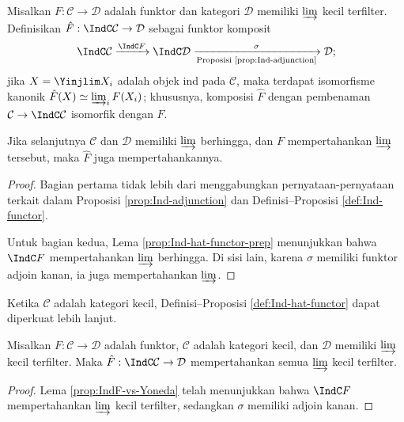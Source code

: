 \begin{definition-proposition}\label{def:Ind-hat-functor}
	Misalkan $F: \mathcal{C} \to \mathcal{D}$ adalah funktor dan kategori $\mathcal{D}$ memiliki $\varinjlim$ kecil terfilter. Definisikan $\hat{F}: \IndC\mathcal{C} \to \mathcal{D}$ sebagai funktor komposit
	\[ \IndC\mathcal{C} \xrightarrow{\IndC F} \IndC\mathcal{D} \xrightarrow[\text{Proposisi \ref{prop:Ind-adjunction}}]{\sigma} \mathcal{D}; \]
	jika $X = \Yinjlim X_i$ adalah objek ind pada $\mathcal{C}$, maka terdapat isomorfisme kanonik $\hat{F}(X) \simeq \varinjlim_i F(X_i)$; khususnya, komposisi $\hat{F}$ dengan pembenaman $\mathcal{C} \to \IndC\mathcal{C}$ isomorfik dengan $F$.
	
	Jika selanjutnya $\mathcal{C}$ dan $\mathcal{D}$ memiliki $\varinjlim$ berhingga, dan $F$ mempertahankan $\varinjlim$ tersebut, maka $\hat{F}$ juga mempertahankannya.
\end{definition-proposition}
\begin{proof}
	Bagian pertama tidak lebih dari menggabungkan pernyataan-pernyataan terkait dalam Proposisi \ref{prop:Ind-adjunction} dan Definisi--Proposisi \ref{def:Ind-functor}.
	
	Untuk bagian kedua, Lema \ref{prop:Ind-hat-functor-prep} menunjukkan bahwa $\IndC F$ mempertahankan $\varinjlim$ berhingga. Di sisi lain, karena $\sigma$ memiliki funktor adjoin kanan, ia juga mempertahankan $\varinjlim$.
\end{proof}

Ketika $\mathcal{C}$ adalah kategori kecil, Definisi--Proposisi \ref{def:Ind-hat-functor} dapat diperkuat lebih lanjut.

\begin{proposition}\label{prop:Ind-hat-small}
	Misalkan $F: \mathcal{C} \to \mathcal{D}$ adalah funktor, $\mathcal{C}$ adalah kategori kecil, dan $\mathcal{D}$ memiliki $\varinjlim$ kecil terfilter. Maka $\hat{F}: \IndC\mathcal{C} \to \mathcal{D}$ mempertahankan semua $\varinjlim$ kecil terfilter.
\end{proposition}
\begin{proof}
	Lema \ref{prop:IndF-vs-Yoneda} telah menunjukkan bahwa $\IndC F$ mempertahankan $\varinjlim$ kecil terfilter, sedangkan $\sigma$ memiliki adjoin kanan.
\end{proof}

